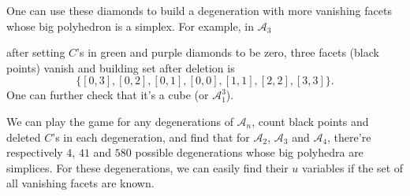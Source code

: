 \documentclass[hidelinks,12pt]{article}
\begin{document}
One can use these diamonds to build a degeneration with more vanishing facets whose big polyhedron is a simplex. For example, in $\mathscr A_3$
\begin{center}
\end{center}
after setting $C$'s in green and purple diamonds to be zero, three facets (black points) vanish and building set after deletion is 
\[
	\{[0,3],[0,2],[0,1],[0,0],[1,1],[2,2],[3,3]\}.
\]
One can further check that it's a cube (or $\mathscr A_1^3$).

We can play the game for any degenerations of $\mathscr A_n$, count black points and deleted $C$'s in each degeneration, and find that for $\mathscr A_2$, $\mathscr A_3$ and $\mathscr A_4$, there're respectively $4$, $41$ and $580$ possible degenerations whose big polyhedra are simplices. For these degenerations, we can easily find their $u$ variables if the set of all vanishing facets are known.
\end{document}
